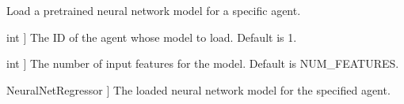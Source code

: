 \documentclass[letterpaper,10pt,english]{sphinxmanual}
\begin{document}

\begin{fulllineitems}
\label{\detokenize{utils:utils.load_model}}
\pysigstartsignatures
{}
\pysigstopsignatures
\sphinxAtStartPar
Load a pre\sphinxhyphen{}trained neural network model for a specific agent.
\begin{description}
\begin{description}
\sphinxlineitem{agent}{[}int {]}
\sphinxAtStartPar
The ID of the agent whose model to load. Default is \sphinxhyphen{}1.

\sphinxlineitem{num\_features}{[}int {]}
\sphinxAtStartPar
The number of input features for the model. Default is NUM\_FEATURES.

\end{description}

\begin{description}
\sphinxlineitem{loaded\_agent\_model}{[}NeuralNetRegressor {]}
\sphinxAtStartPar
The loaded neural network model for the specified agent.

\end{description}

\end{description}

\end{fulllineitems}

\end{document}
